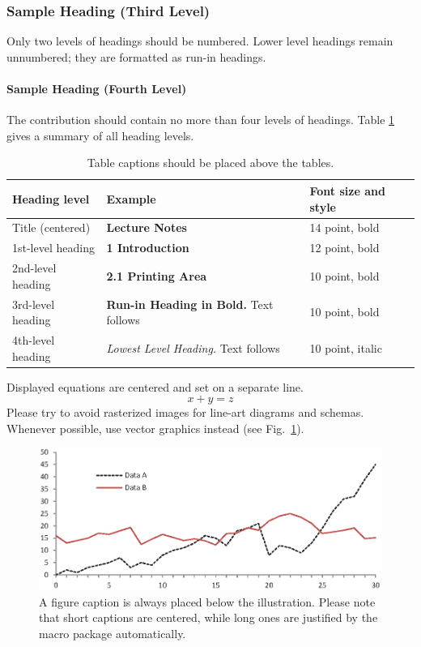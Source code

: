 \documentclass[runningheads]{llncs}
\begin{document}
\subsubsection{Sample Heading (Third Level)} Only two levels of
headings should be numbered. Lower level headings remain unnumbered;
they are formatted as run-in headings.
\paragraph{Sample Heading (Fourth Level)}
The contribution should contain no more than four levels of
headings. Table \ref{tab1} gives a summary of all heading levels.

\begin{table}
\caption{Table captions should be placed above the
tables.}\label{tab1}
\begin{tabular}{|l|l|l|}
\hline
Heading level &  Example & Font size and style\\
\hline
Title (centered) &  {\Large\bfseries Lecture Notes} & 14 point, bold\\
1st-level heading &  {\large\bfseries 1 Introduction} & 12 point, bold\\
2nd-level heading & {\bfseries 2.1 Printing Area} & 10 point, bold\\
3rd-level heading & {\bfseries Run-in Heading in Bold.} Text follows & 10 point, bold\\
4th-level heading & {\itshape Lowest Level Heading.} Text follows & 10 point, italic\\
\hline
\end{tabular}
\end{table}


\noindent Displayed equations are centered and set on a separate
line.
\begin{equation}
x + y = z
\end{equation}
Please try to avoid rasterized images for line-art diagrams and
schemas. Whenever possible, use vector graphics instead (see
Fig.~\ref{fig1}).

\begin{figure}
\includegraphics[width=\textwidth]{fig1.eps}
\caption{A figure caption is always placed below the illustration.
Please note that short captions are centered, while long ones are
justified by the macro package automatically.} \label{fig1}
\end{figure}
\end{document}
